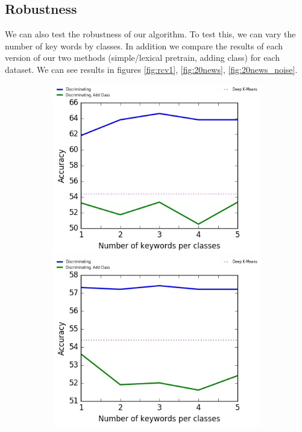 \subsection{Robustness}
We can also test the robustness of our algorithm. To test this, we
can vary the number of key words by classes. In addition we compare
the results of each version of our two methods (simple/lexical pretrain, adding 
class) for each dataset.
We can see results  in 
figures \ref{fig:rcv1}, \ref{fig:20news}, \ref{fig:20news_noise}.
\begin{figure}[!h]
\begin{subfigure}[b]{\textwidth}
\begin{minipage}{0.5\linewidth}
\centering
  \includegraphics[scale=0.49]{parts/res/dat_file/acc/RCV1.jpg}     
\end{minipage}
  \begin{minipage}{0.5\linewidth}
\centering
   \includegraphics[scale=0.49]{parts/res/dat_file/acc/RCV1_simple.jpg}     

\end{minipage}
\end{subfigure}
\end{figure}
